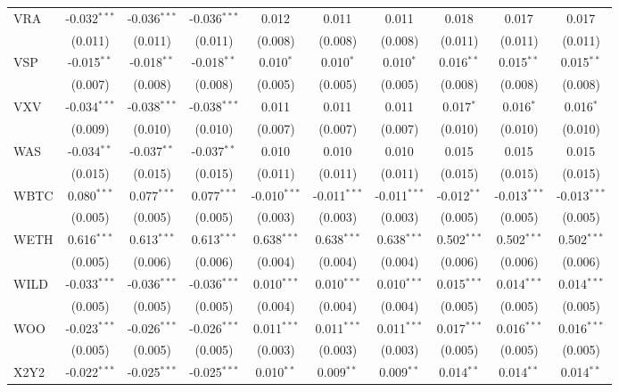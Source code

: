 \begin{table}[!htbp]
\begin{tabular}{@{\extracolsep{5pt}}lccccccccc}
 VRA & -0.032$^{***}$ & -0.036$^{***}$ & -0.036$^{***}$ & 0.012$^{}$ & 0.011$^{}$ & 0.011$^{}$ & 0.018$^{}$ & 0.017$^{}$ & 0.017$^{}$ \\
  & (0.011) & (0.011) & (0.011) & (0.008) & (0.008) & (0.008) & (0.011) & (0.011) & (0.011) \\
 VSP & -0.015$^{**}$ & -0.018$^{**}$ & -0.018$^{**}$ & 0.010$^{*}$ & 0.010$^{*}$ & 0.010$^{*}$ & 0.016$^{**}$ & 0.015$^{**}$ & 0.015$^{**}$ \\
  & (0.007) & (0.008) & (0.008) & (0.005) & (0.005) & (0.005) & (0.008) & (0.008) & (0.008) \\
 VXV & -0.034$^{***}$ & -0.038$^{***}$ & -0.038$^{***}$ & 0.011$^{}$ & 0.011$^{}$ & 0.011$^{}$ & 0.017$^{*}$ & 0.016$^{*}$ & 0.016$^{*}$ \\
  & (0.009) & (0.010) & (0.010) & (0.007) & (0.007) & (0.007) & (0.010) & (0.010) & (0.010) \\
 WAS & -0.034$^{**}$ & -0.037$^{**}$ & -0.037$^{**}$ & 0.010$^{}$ & 0.010$^{}$ & 0.010$^{}$ & 0.015$^{}$ & 0.015$^{}$ & 0.015$^{}$ \\
  & (0.015) & (0.015) & (0.015) & (0.011) & (0.011) & (0.011) & (0.015) & (0.015) & (0.015) \\
 WBTC & 0.080$^{***}$ & 0.077$^{***}$ & 0.077$^{***}$ & -0.010$^{***}$ & -0.011$^{***}$ & -0.011$^{***}$ & -0.012$^{**}$ & -0.013$^{***}$ & -0.013$^{***}$ \\
  & (0.005) & (0.005) & (0.005) & (0.003) & (0.003) & (0.003) & (0.005) & (0.005) & (0.005) \\
 WETH & 0.616$^{***}$ & 0.613$^{***}$ & 0.613$^{***}$ & 0.638$^{***}$ & 0.638$^{***}$ & 0.638$^{***}$ & 0.502$^{***}$ & 0.502$^{***}$ & 0.502$^{***}$ \\
  & (0.005) & (0.006) & (0.006) & (0.004) & (0.004) & (0.004) & (0.006) & (0.006) & (0.006) \\
 WILD & -0.033$^{***}$ & -0.036$^{***}$ & -0.036$^{***}$ & 0.010$^{***}$ & 0.010$^{***}$ & 0.010$^{***}$ & 0.015$^{***}$ & 0.014$^{***}$ & 0.014$^{***}$ \\
  & (0.005) & (0.005) & (0.005) & (0.004) & (0.004) & (0.004) & (0.005) & (0.005) & (0.005) \\
 WOO & -0.023$^{***}$ & -0.026$^{***}$ & -0.026$^{***}$ & 0.011$^{***}$ & 0.011$^{***}$ & 0.011$^{***}$ & 0.017$^{***}$ & 0.016$^{***}$ & 0.016$^{***}$ \\
  & (0.005) & (0.005) & (0.005) & (0.003) & (0.003) & (0.003) & (0.005) & (0.005) & (0.005) \\
 X2Y2 & -0.022$^{***}$ & -0.025$^{***}$ & -0.025$^{***}$ & 0.010$^{**}$ & 0.009$^{**}$ & 0.009$^{**}$ & 0.014$^{**}$ & 0.014$^{**}$ & 0.014$^{**}$ \\

\end{tabular}
\end{table}
